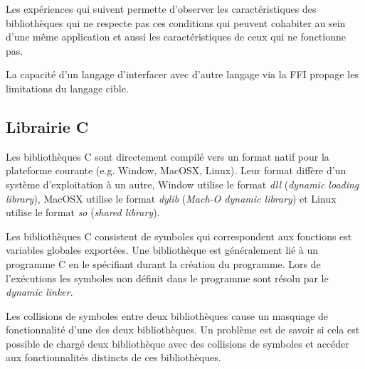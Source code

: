 Les expériences qui suivent permette d'observer
les caractéristiques des bibliothèques qui ne respecte pas ces conditions
qui peuvent cohabiter au sein d'une même application et aussi les
caractéristiques de ceux qui ne fonctionne pas.

La capacité d'un langage d'interfacer avec d'autre langage via la FFI propage
les limitations du langage cible.


\subsection{Librairie C}
Les bibliothèques C sont directement compilé vers un format natif pour la plateforme courante
(e.g. Window, MacOSX, Linux). Leur format diffère d'un système d'exploitation à un autre, Window utilise le format \textit{dll}
(\textit{dynamic loading library}), MacOSX utilise le format \textit{dylib} (\textit{Mach-O dynamic library})
et Linux utilise le format \textit{so} (\textit{shared library}).

Les bibliothèques C consistent de symboles qui correspondent aux fonctions est variables
globales exportées. Une bibliothèque est généralement lié à un programme C en le spécifiant
durant la création du programme. Lors de l'exécutions les symboles non définit dans le programme
sont résolu par le \textit{dynamic linker}.

Les collisions de symboles entre deux bibliothèques cause un masquage de
fonctionnalité d'une des deux bibliothèques. Un problème est de savoir si cela est
possible de chargé deux bibliothèque avec des collisions de symboles et accéder aux
fonctionnalités distincts de ces bibliothèques.

